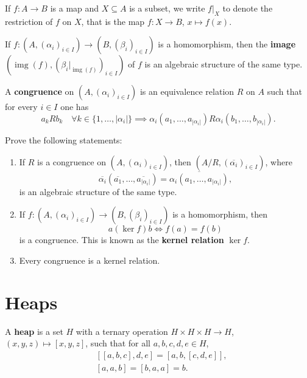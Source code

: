 \documentclass{svmult}
\newcommand{\im}{\operatorname{img}}
\begin{document}
If $f\colon A\to B$ is a map and $X\subseteq A$ is a subset, 
we write $f|_X$ to denote 
the restriction of $f$ on $X$, that is the
map $f\colon X\to B$, $x\mapsto f(x)$. 

\begin{exercise}
    If $f\colon (A,(\alpha_i)_{i\in I})\to (B,(\beta_i)_{i\in I})$ is
    a homomorphism, then the \textbf{image}  
    $\left(\im(f),(\beta_i|_{\im(f)})_{i\in I}\right)$ of $f$ 
    is an algebraic structure of the same type. 
\end{exercise}

\begin{definition}
    A \textbf{congruence} on 
    $(A,(\alpha_i)_{i\in I})$ is an equivalence relation $R$ on $A$ 
    such that for every $i\in I$ one has 
    \[
    a_k R b_k\quad\forall k\in\{1,\dots,|\alpha_i|\}\implies \alpha_i(a_1,\dots,a_{|\alpha_i|}) R \alpha_i(b_1,\dots,b_{|\alpha_i|}).
    \]
\end{definition}

\begin{exercise}
Prove the following statements:
\begin{enumerate}
    \item If $R$ is a congruence on $(A,(\alpha_i)_{i\in I})$, then 
    $\left(A/R,(\overline{\alpha_i})_{i\in I}\right)$, 
    where 
    \[
    \overline{\alpha_i}(\overline{a_1},\dots,\overline{a_{|\alpha_i|}})
    =\overline{\alpha_i(a_1,\dots,a_{|\alpha_i|})},
    \]
    is an algebraic structure of the same type. 
    \item If $f\colon (A,(\alpha_i)_{i\in I})\to (B,(\beta_i)_{i\in I})$ is a homomorphism, 
    then 
    \[
    a(\ker f)b\Longleftrightarrow f(a)=f(b)
    \]
    is a congruence. This is known as the \textbf{kernel relation}
    $\ker f$.  
    \item Every congruence is a kernel relation. 
\end{enumerate}
\end{exercise}

\section{Heaps}

\begin{definition}
A \textbf{heap} is a set $H$ with a ternary operation $H\times H\times H\to H$, $(x,y,z)\mapsto [x,y,z]$, 
such that for all $a,b,c,d,e\in H$, 
\begin{align}
    \label{eq:associativity}&[[a,b,c],d,e]=[a,b,[c,d,e]],\\
    \label{eq:Malcev}&[a,a,b]=[b,a,a]=b.
\end{align}
\end{definition}
\end{document}

